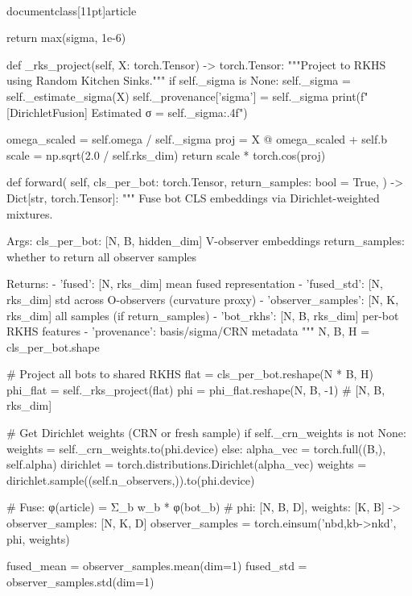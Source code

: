\\documentclass[11pt]{article}
\begin{document}
\begin{CodeBlock}
            return max(sigma, 1e-6)
    
    def _rks_project(self, X: torch.Tensor) -> torch.Tensor:
        """Project to RKHS using Random Kitchen Sinks."""
        if self._sigma is None:
            self._sigma = self._estimate_sigma(X)
            self._provenance['sigma'] = self._sigma
            print(f"  [DirichletFusion] Estimated σ = {self._sigma:.4f}")
        
        omega_scaled = self.omega / self._sigma
        proj = X @ omega_scaled + self.b
        scale = np.sqrt(2.0 / self.rks_dim)
        return scale * torch.cos(proj)
    
    def forward(
        self,
        cls_per_bot: torch.Tensor,
        return_samples: bool = True,
    ) -> Dict[str, torch.Tensor]:
        """
        Fuse bot CLS embeddings via Dirichlet-weighted mixtures.
        
        Args:
            cls_per_bot: [N, B, hidden_dim] V-observer embeddings
            return_samples: whether to return all observer samples
            
        Returns:
            - 'fused': [N, rks_dim] mean fused representation
            - 'fused_std': [N, rks_dim] std across O-observers (curvature proxy)
            - 'observer_samples': [N, K, rks_dim] all samples (if return_samples)
            - 'bot_rkhs': [N, B, rks_dim] per-bot RKHS features
            - 'provenance': basis/sigma/CRN metadata
        """
        N, B, H = cls_per_bot.shape
        
        # Project all bots to shared RKHS
        flat = cls_per_bot.reshape(N * B, H)
        phi_flat = self._rks_project(flat)
        phi = phi_flat.reshape(N, B, -1)  # [N, B, rks_dim]
        
        # Get Dirichlet weights (CRN or fresh sample)
        if self._crn_weights is not None:
            weights = self._crn_weights.to(phi.device)
        else:
            alpha_vec = torch.full((B,), self.alpha)
            dirichlet = torch.distributions.Dirichlet(alpha_vec)
            weights = dirichlet.sample((self.n_observers,)).to(phi.device)
        
        # Fuse: φ(article) = Σ_b w_b * φ(bot_b)
        # phi: [N, B, D], weights: [K, B] -> observer_samples: [N, K, D]
        observer_samples = torch.einsum('nbd,kb->nkd', phi, weights)
        
        fused_mean = observer_samples.mean(dim=1)
        fused_std = observer_samples.std(dim=1)
        

\end{CodeBlock}
\end{document}
